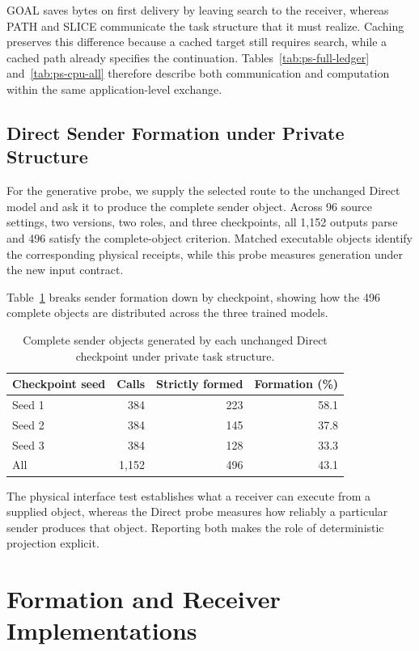 \documentclass[sigconf,nonacm,balance=false]{aamas}
\newcommand{\tabstyle}{\small\setlength{\tabcolsep}{3pt}\renewcommand{\arraystretch}{1.10}}
\begin{document}
GOAL saves bytes on first delivery by leaving search to the receiver, whereas PATH and SLICE communicate the task structure that it must realize. Caching preserves this difference because a cached target still requires search, while a cached path already specifies the continuation. Tables~\ref{tab:ps-full-ledger} and~\ref{tab:ps-cpu-all} therefore describe both communication and computation within the same application-level exchange.

\subsection{Direct Sender Formation under Private Structure}

For the generative probe, we supply the selected route to the unchanged Direct model and ask it to produce the complete sender object. Across 96 source settings, two versions, two roles, and three checkpoints, all 1,152 outputs parse and 496 satisfy the complete-object criterion. Matched executable objects identify the corresponding physical receipts, while this probe measures generation under the new input contract.

Table~\ref{tab:ps-direct} breaks sender formation down by checkpoint, showing how the 496 complete objects are distributed across the three trained models.

\begin{table}[!htbp]
\centering\tabstyle
\caption{Complete sender objects generated by each unchanged Direct checkpoint under private task structure.}
\label{tab:ps-direct}
\begin{tabular}{@{}lrrr@{}}
\toprule
Checkpoint seed & Calls & Strictly formed & Formation (\%)\\
\midrule
Seed 1 & 384 & 223 & 58.1\\
Seed 2 & 384 & 145 & 37.8\\
Seed 3 & 384 & 128 & 33.3\\
All & 1,152 & 496 & 43.1\\
\bottomrule
\end{tabular}
\end{table}

The physical interface test establishes what a receiver can execute from a supplied object, whereas the Direct probe measures how reliably a particular sender produces that object. Reporting both makes the role of deterministic projection explicit.

\section{Formation and Receiver Implementations}
\label{sec:supp-implementations}
\end{document}
